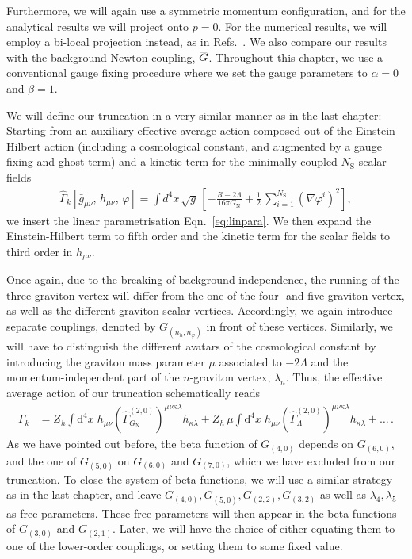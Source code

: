 \documentclass[11pt]{book}
\newcommand{\overbar}[1]{\mkern 1.5mu\overline{\mkern-1.5mu#1\mkern-1.5mu}\mkern 1.5mu}
\newcommand\bgmunu{ \bar g_{\mu\nu} }
\newcommand\hmunu{ h_{\mu\nu} }
\newcommand\NS{ N_{\scriptscriptstyle{\mathrm{S}}} }
\newcommand\GNewton{ G_{\scriptscriptstyle{\mathrm{N}}}{} }
\newcommand\Gback{ \overbar{G} } %
\numberwithin{equation}{chapter}
\begin{document}
Furthermore, we will again use a symmetric momentum configuration, and
for the analytical results we will project onto $p=0$.
For the numerical results, we will employ a bi-local projection instead, as in
Refs.~\cite{Christiansen:2015rva,Meibohm:2015twa}.
We also compare our results with the background Newton coupling, $\Gback$.
Throughout this chapter, we use a conventional gauge fixing procedure
where we set the gauge parameters to $\alpha=0$ and $\beta=1$.

We will define our truncation in a very similar manner as in the last chapter:
Starting from an auxiliary effective average action composed out of the Einstein-Hilbert action
(including a cosmological constant, and augmented by a gauge fixing and ghost term)
and a kinetic term for the minimally coupled $\NS$ scalar fields
\begin{align}
  \hat \Gamma_k[\bgmunu, \, \hmunu, \, \varphi] = \int d^4x \, \sqrt{g} \,
  \left[
    - \frac{R - 2 \Lambda}{16 \pi \GNewton} + \frac{1}{2} \, \sum_{i=1}^{\NS} \left( \nabla\varphi^i \right)^2
  \right] ,
\end{align}
we insert the linear parametrisation Eqn.~\eqref{eq:linpara}.
We then expand the Einstein-Hilbert term to fifth order and
the kinetic term for the scalar fields to third order in $h_{\mu \nu}$.

Once again, due to the breaking of background independence,
the running of the three-graviton vertex will differ from the one of the four- and five-graviton vertex,
as well as the different graviton-scalar vertices.
Accordingly, we again introduce separate couplings,
denoted by $G_{(n_h, n_{\varphi})}$ in front of these vertices.
Similarly, we will have to distinguish the different avatars of the cosmological constant
by introducing the graviton mass parameter $\mu$
associated to $-2 \Lambda$ and the momentum-independent part of the $n$-graviton vertex,
$\lambda_n$.
Thus, the effective average action of our truncation schematically reads
\begin{align}
  \Gamma_k
  &= Z_h \int \mathrm d^4 x \;
  h_{\mu \nu} \left( \hat \Gamma_{\GNewton}^{(2,0)} \right)^{\mu \nu \kappa \lambda} h_{\kappa \lambda}
  + Z_h \, \mu \int \mathrm  d^4 x \;
  h_{\mu \nu} \left( \hat \Gamma_{\Lambda}^{(2,0)} \right)^{\mu \nu \kappa \lambda} h_{\kappa \lambda}
  + \dots \,.
\end{align}
As we have pointed out before, the beta function of $G_{(4,0)}$
depends on $G_{(6,0)}$, and the one of $G_{(5,0)}$
on $G_{(6,0)}$ and $G_{(7,0)}$, which we have excluded from our truncation.
To close the system of beta functions, we will use a similar strategy as in the last chapter,
and leave $G_{(4,0)}, G_{(5,0)}, G_{(2,2)}, G_{(3,2)}$
as well as $\lambda_4, \lambda_5$ as free parameters.
These free parameters will then appear in the beta functions of $G_{(3,0)}$ and $G_{(2,1)}$.
Later, we will have the choice of either equating them to one of the lower-order couplings,
or setting them to some fixed value.
\end{document}
